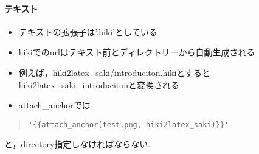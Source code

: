 \paragraph{テキスト}
\begin{itemize}
\item テキストの拡張子は'.hiki'としている
\item hikiでのurlはテキスト前とディレクトリーから自動生成される
\item 例えば，hiki2latex\_saki/introduciton.hikiとするとhiki2latex\_saki\_introducitonと変換される
\item attach\_anchorでは
\end{itemize}\begin{quote}\begin{verbatim}
'{{attach_anchor(test.png, hiki2latex_saki)}}'
\end{verbatim}\end{quote}
と，directory指定しなければならない.